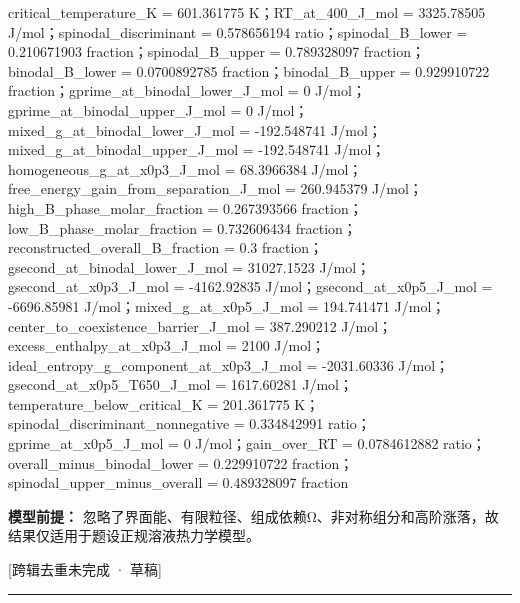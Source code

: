 \documentclass[UTF8,11pt,a4paper]{ctexart}
\begin{document}
critical\_temperature\_K = 601.361775 K；RT\_at\_400\_J\_mol = 3325.78505 J/mol；spinodal\_discriminant = 0.578656194 ratio；spinodal\_B\_lower = 0.210671903 fraction；spinodal\_B\_upper = 0.789328097 fraction；binodal\_B\_lower = 0.0700892785 fraction；binodal\_B\_upper = 0.929910722 fraction；gprime\_at\_binodal\_lower\_J\_mol = 0 J/mol；gprime\_at\_binodal\_upper\_J\_mol = 0 J/mol；mixed\_g\_at\_binodal\_lower\_J\_mol = -192.548741 J/mol；mixed\_g\_at\_binodal\_upper\_J\_mol = -192.548741 J/mol；homogeneous\_g\_at\_x0p3\_J\_mol = 68.3966384 J/mol；free\_energy\_gain\_from\_separation\_J\_mol = 260.945379 J/mol；high\_B\_phase\_molar\_fraction = 0.267393566 fraction；low\_B\_phase\_molar\_fraction = 0.732606434 fraction；reconstructed\_overall\_B\_fraction = 0.3 fraction；gsecond\_at\_binodal\_lower\_J\_mol = 31027.1523 J/mol；gsecond\_at\_x0p3\_J\_mol = -4162.92835 J/mol；gsecond\_at\_x0p5\_J\_mol = -6696.85981 J/mol；mixed\_g\_at\_x0p5\_J\_mol = 194.741471 J/mol；center\_to\_coexistence\_barrier\_J\_mol = 387.290212 J/mol；excess\_enthalpy\_at\_x0p3\_J\_mol = 2100 J/mol；ideal\_entropy\_g\_component\_at\_x0p3\_J\_mol = -2031.60336 J/mol；gsecond\_at\_x0p5\_T650\_J\_mol = 1617.60281 J/mol；temperature\_below\_critical\_K = 201.361775 K；spinodal\_discriminant\_nonnegative = 0.334842991 ratio；gprime\_at\_x0p5\_J\_mol = 0 J/mol；gain\_over\_RT = 0.0784612882 ratio；overall\_minus\_binodal\_lower = 0.229910722 fraction；spinodal\_upper\_minus\_overall = 0.489328097 fraction\par
\noindent\textbf{模型前提：}
忽略了界面能、有限粒径、组成依赖Ω、非对称组分和高阶涨落，故结果仅适用于题设正规溶液热力学模型。\par
\noindent\textcolor{red!65!black}{[跨辑去重未完成 · 草稿]} \par
\medskip\hrule\medskip
{}
\end{document}

